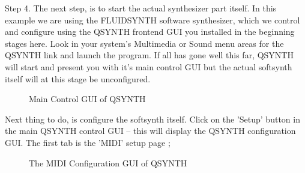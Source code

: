 \documentclass[letterpaper]{report}
\begin{document}
Step 4. The next step, is to start the actual synthesizer part itself.
In this example we are using the FLUIDSYNTH software synthesizer, which 
we control and configure using the QSYNTH frontend GUI you installed in
the beginning stages here. Look in your system's Multimedia or Sound menu
areas for the QSYNTH link and launch the program. If all has gone well this
far, QSYNTH will start and present you with it's main control GUI but the
actual softsynth itself will at this stage be unconfigured.


\begin{figure}
\caption{Main Control GUI of QSYNTH}
\end{figure}


Next thing to do, is configure the softsynth itself. Click on the 'Setup'
button in the main QSYNTH control GUI -- this will display the QSYNTH
configuration GUI. The first tab is the 'MIDI' setup page ;


\begin{figure}
\caption{The MIDI Configuration GUI of QSYNTH}
\end{figure}
\end{document}
